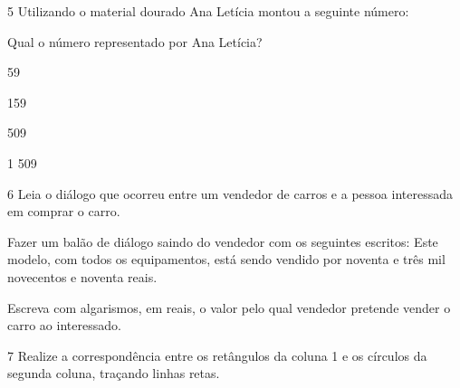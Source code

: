 
\num{5} Utilizando o material dourado Ana Letícia montou a seguinte número:



Qual o número representado por Ana Letícia?

\begin{escolha}
\item
  59
\item
  159
\item
  509
\item
  1 509
\end{escolha}


\num{6} Leia o diálogo que ocorreu entre um vendedor de carros e a pessoa
interessada em comprar o carro.


Fazer um balão de diálogo saindo do vendedor com os seguintes escritos:
Este modelo, com todos os equipamentos, está sendo vendido por noventa e
três mil novecentos e noventa reais.

Escreva com algarismos, em reais, o valor pelo qual vendedor pretende
vender o carro ao interessado.



\num{7} Realize a correspondência entre os retângulos da coluna 1 e os
círculos da segunda coluna, traçando linhas retas.

\begin{multicols}{2}







\end{multicols}


